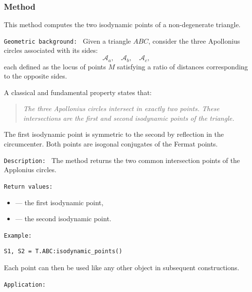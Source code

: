 \subsubsection{Method }
\label{ssub:isodynamic_points}

This method computes the two isodynamic points of a non-degenerate triangle.

\medskip

\texttt{Geometric background: }
Given a triangle $ABC$, consider the three Apollonius circles associated with its sides:
\[
\mathcal{A}_{a},\quad \mathcal{A}_{b},\quad \mathcal{A}_{c},
\]
each defined as the locus of points $M$ satisfying a ratio of distances
corresponding to the opposite sides.

A classical and fundamental property states that:

\begin{quote}
\emph{The three Apollonius circles intersect in exactly two points.
These intersections are the first and second isodynamic points of the triangle.}
\end{quote}

The first isodynamic point is symmetric to the second by reflection in the
circumcenter. Both points are isogonal conjugates of the Fermat points.

\medskip

\texttt{Description: }
The method   returns the two common intersection points of the Applonius circles.

\medskip
\texttt{Return values: }
\begin{itemize}
  \item {} — the first isodynamic point,
  \item {} — the second isodynamic point.
\end{itemize}

\medskip
\texttt{Example: }
\begin{verbatim}
S1, S2 = T.ABC:isodynamic_points()
\end{verbatim}

Each point can then be used like any other  object in subsequent constructions.

\medskip
\texttt{Application: }

\begin{tkzexample}[vbox]
\begin{center}
\end{center}
\end{tkzexample}


